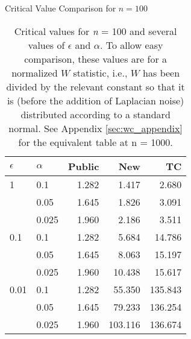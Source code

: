 \begin{table}[ht]
\centering
\caption{Critical Value Comparison for $n=100$}\label{tab:n_100_comp}
\begin{tabular}{llrrr}
  \hline
$\epsilon$ & $\alpha$ & Public & New & TC \\ 
  \hline
1 & 0.1 & 1.282 & 1.417 & 2.680 \\ 
   & 0.05 & 1.645 & 1.826 & 3.091 \\ 
   & 0.025 & 1.960 & 2.186 & 3.511 \\ 
   \hline
0.1 & 0.1 & 1.282 & 5.684 & 14.786 \\ 
   & 0.05 & 1.645 & 8.063 & 15.197 \\ 
   & 0.025 & 1.960 & 10.438 & 15.617 \\ 
   \hline
0.01 & 0.1 & 1.282 & 55.350 & 135.843 \\ 
   & 0.05 & 1.645 & 79.233 & 136.254 \\ 
   & 0.025 & 1.960 & 103.116 & 136.674 \\ 
   \hline
\end{tabular}
\\[10pt]
\caption*{Critical values for \textit{n} = 100 and several values of $\epsilon$ and $\alpha$.  To allow easy comparison, these values are for a normalized $W$ statistic, i.e., $W$ has been divided by the relevant constant so that it is (before the addition of Laplacian noise) distributed according to a standard normal. See Appendix \ref{sec:wc_appendix} for the equivalent table at n = 1000.}
\end{table}
